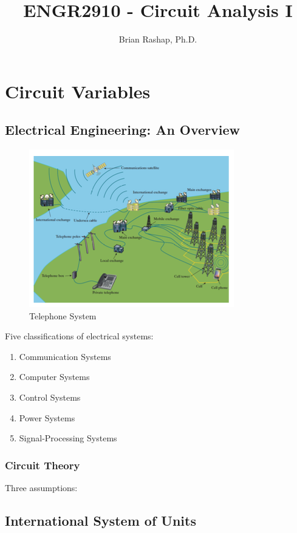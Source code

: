 \documentclass[14pt]{memoir}
\author{Brian Rashap, Ph.D.}
\title{ENGR2910 - Circuit Analysis I}
\begin{document}
\frontmatter

\maketitle


\mainmatter

\chapter{Circuit Variables}

\section{Electrical Engineering: An Overview}

\begin{figure}[h]
\begin{center}
\includegraphics[scale=0.40]{fig/fig01_01.png}
\caption{Telephone System}
\label{fig:01_01}
\end{center}
\end{figure}

Five classifications of electrical systems:
\begin{enumerate}
\item Communication Systems
\item Computer Systems
\item Control Systems
\item Power Systems
\item Signal-Processing Systems
\end{enumerate}

\subsection{Circuit Theory}
Three assumptions:

\section{International System of Units}
\end{document}
